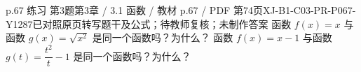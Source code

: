 \par\noindent\begin{minipage}{\linewidth}
\begin{bankitem}{p.67 练习 第3题}{第3章 / 3.1 函数 / 教材 p.67 / PDF 第74页}{XJ-B1-C03-PR-P067-Y1287}{已对照原页转写题干及公式；待教师复核；未制作答案}
函数 $f(x)=x$ 与函数 $g(x)=\sqrt{x^2}$ 是同一个函数吗？为什么？
函数 $f(x)=x-1$ 与函数 $g(t)=\dfrac{t^2}t-1$ 是同一个函数吗？为什么？
\end{bankitem}
\end{minipage}\par\medskip
